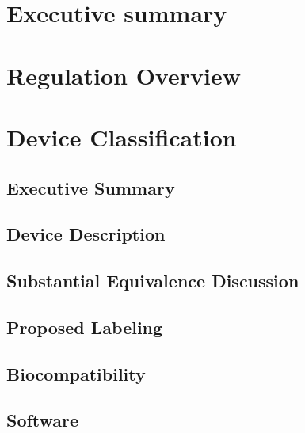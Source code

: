 \documentclass{article}
\begin{document}

\setcounter{tocdepth}{3}
\tableofcontents
\newpage

\section*{Executive summary}
\label{sec:exec-summary}

\section{Regulation Overview}
\label{sec:test-administration}

\section{Device Classification}
\label{sec:protocols}





\setcounter{subsection}{0}






\subsection{Executive Summary}
\subsection{Device Description}
\subsection{Substantial Equivalence Discussion}
\subsection{Proposed Labeling}

\subsection{Biocompatibility}
\subsection{Software}
\end{document}
